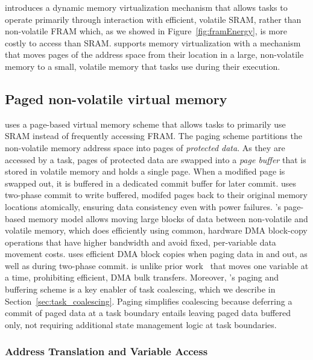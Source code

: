 \sys introduces a dynamic memory virtualization mechanism that allows tasks to
operate primarily through interaction with efficient, volatile SRAM, rather
than non-volatile FRAM which, as we showed in Figure~\ref{fig:framEnergy}, is
more costly to access than SRAM. \sys supports memory virtualization with a
mechanism that moves pages of the address space from their location in  a
large, non-volatile memory to a small, volatile memory that tasks use during
their execution.
 

\subsection{Paged non-volatile virtual memory} 

\sys uses a page-based virtual memory scheme that allows tasks to primarily use
SRAM instead of frequently accessing FRAM.  The paging scheme partitions the
non-volatile memory address space into pages of {\em protected data}. As they
are accessed by a task, pages of protected data are swapped into a {\em page
buffer} that is stored in volatile memory and holds a single page. When a
modified page is swapped out, it is buffered in a dedicated commit buffer for
later commit.  \sys uses two-phase commit to write buffered, modifed pages back
to their original memory locations atomically, ensuring data consistency even
with power failures.
%
\sys's page-based memory model allows moving large blocks of data between
non-volatile and volatile memory, which \sys does efficiently using common,
hardware DMA block-copy operations that have higher bandwidth and avoid fixed,
per-variable data movement costs.  \sys uses efficient DMA block copies when
paging data in and out, as well as during two-phase commit.  \sys is unlike
prior work~\cite{chain,alpaca} that moves one variable at a time, prohibiting
efficient, DMA bulk transfers. 
%
Moreover, \sys's paging and buffering scheme is a key enabler of task
coalescing, which we describe in Section~\ref{sec:task_coalescing}. Paging
simplifies coalescing because deferring a commit of paged data at a task
boundary entails leaving paged data buffered only, not requiring
additional state management logic at task boundaries.

\subsubsection{Address Translation and Variable Access}

